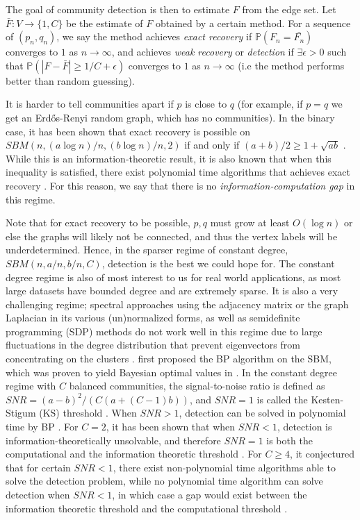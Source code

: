 \documentclass{article} \usepackage{iclr2019_conference,times}
\begin{document}
The goal of community detection is then to estimate $F$ from the edge set. Let $\bar{F}:V \rightarrow \{1,C\}$ be the estimate of $F$ obtained by a certain method. For a sequence of $(p_n, q_n)$,
we say the method achieves \textit{exact recovery} if $\mathbb{P}( F_n = \bar{F_n})$ converges to $1$ as $n \to \infty$, and achieves \textit{weak recovery} or \textit{detection} if $\exists \epsilon > 0$ such that $\mathbb{P}(|F-\bar{F}| \geq 1 / C +\epsilon)$ converges to $1$ as $n \to \infty$ (i.e the method performs better than random guessing).



It is harder to tell communities apart if $p$ is close to $q$ (for example, if $p=q$ we get an Erd\H{o}s-Renyi random graph, which has no communities). In the binary case, it has been shown that exact recovery is possible on $SBM(n, (a \log n) / n, (b \log n) / n, 2)$ if and only if $(a+b) / 2 \geq 1 + \sqrt{ab}$ \citep{MNS,ABH}. While this is an information-theoretic result, it is also known that when this inequality is satisfied, there exist polynomial time algorithms that achieves exact recovery \citep{abbe2017community,MNS}. For this reason, we say that there is no \textit{information-computation gap} in this regime.


Note that for exact recovery to be possible, $p, q$ must grow at least $O(\log n)$ or else the graphs will likely not be connected, and thus the vertex labels will be underdetermined. Hence, in the sparser regime of constant degree, $SBM(n , a / n, b / n, C)$, detection is the best we could hope for. The constant degree regime is also of most interest to us for real world applications, as most large datasets have bounded degree and are extremely sparse. It is also a very challenging regime; spectral approaches using the adjacency matrix or the graph Laplacian in its various (un)normalized forms, as well as semidefinite programming (SDP) methods do not work well in this regime due to large fluctuations in the degree distribution that prevent eigenvectors from concentrating on the clusters \citep{abbe2017community}.
\cite{decelle2011asymptotic} first proposed the BP algorithm on the SBM, which was proven to yield Bayesian optimal values in \cite{coja2016information}. 
In the constant degree regime with $C$ balanced communities, the signal-to-noise ratio is defined as $SNR = (a-b)^2/(C(a+(C-1)b))$, and $SNR = 1$ is called the Kesten-Stigum (KS) threshold \citep{kesten1966limit}. 
When $SNR > 1$, detection can be solved in polynomial time by BP \citep{abbe2017community, decelle2011asymptotic}. For $C=2$, it has been shown that when $SNR < 1$, detection is information-theoretically unsolvable, and therefore $SNR = 1$ is both the computational and the information theoretic threshold \citep{abbe2017community}. For $C \geq 4$, it conjectured that for certain $SNR < 1$, there exist non-polynomial time algorithms able to solve the detection problem, while no polynomial time algorithm can solve detection when $SNR < 1$, in which case a gap would exist between the information theoretic threshold and the computational threshold \citep{abbe2017community}.
\end{document}
